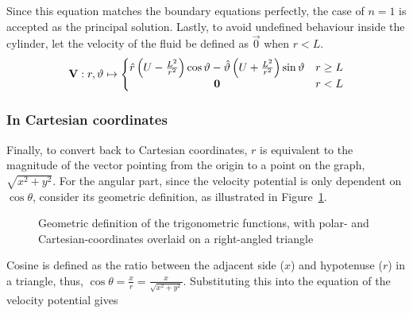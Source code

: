 Since this equation matches the boundary equations perfectly, the case of $n=1$ is accepted as the principal solution. Lastly, to avoid undefined behaviour inside the cylinder, let the velocity of the fluid be defined as $\vec{0}$ when $r<L$.
\begin{equation}\label{equation:VELOCITY:POLAR}
    \mathbf{V}:r,\vartheta\mapsto\left\{\begin{matrix}
        \hat{r}\left(U-\frac{L^2}{r^{2}}\right)\cos\vartheta-\hat{\vartheta}\left(U+\frac{L^2}{r^{2}}\right)\sin\vartheta&r\geq L\\
        \mathbf{0}&r<L
    \end{matrix}\right.
\end{equation}

\subsubsection{In Cartesian coordinates}\label{section:VELOCITY:CARTESIAN}
Finally, to convert back to Cartesian coordinates, $r$ is equivalent to the magnitude of the vector pointing from the origin to a point on the graph, $\sqrt{x^2+y^2}$. For the angular part, since the velocity potential is only dependent
on $\cos\theta$, consider its geometric definition, as illustrated in Figure~\ref{figure:TRIGENOMETRY}. 
\begin{figure}
    \begin{center}        
    \end{center}
    \label{figure:TRIGENOMETRY}
    \caption{Geometric definition of the trigonometric functions, with polar- and Cartesian-coordinates overlaid on a right-angled triangle}
\end{figure}
Cosine is defined as the ratio between the adjacent side ($x$) and hypotenuse ($r$) in a triangle, thus, $\cos\theta=\frac{x}{r}=\frac{x}{\sqrt{x^2+y^2}}$. Substituting this into the equation of the velocity potential gives
